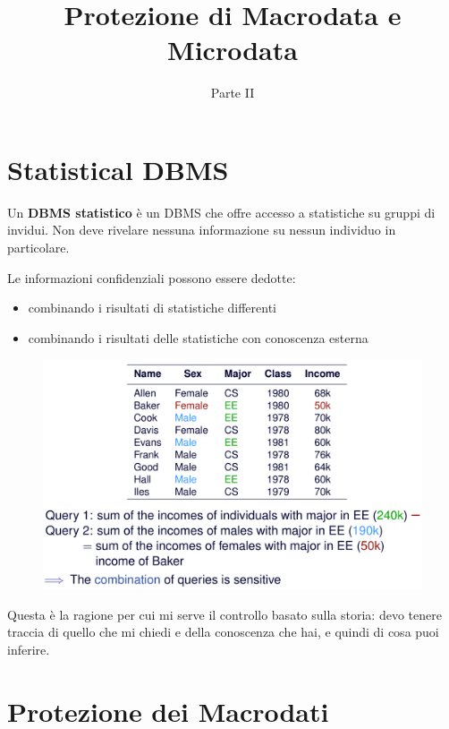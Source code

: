 \documentclass{report}
\title{Protezione di Macrodata e Microdata}
\date{Parte II}
\begin{document}
\maketitle

\tableofcontents
\newpage

\chapter{Statistical DBMS}
Un \textbf{DBMS statistico} è un DBMS che offre accesso a statistiche 
su gruppi di invidui. Non deve rivelare nessuna informazione su nessun
individuo in particolare.

Le informazioni confidenziali possono essere dedotte:
\begin{itemize}
    \item combinando i risultati di statistiche differenti
    \item combinando i risultati delle statistiche con conoscenza esterna
\end{itemize} 

\begin{figure}[ht]
    \centering
    \includegraphics[width=1\linewidth]{images/stat-dbms.png}
\end{figure}

Questa è la ragione per cui mi serve il controllo basato sulla 
storia: devo tenere traccia di quello che mi chiedi e della 
conoscenza che hai, e quindi di cosa puoi inferire.

\chapter{Protezione dei Macrodati}
\end{document}
